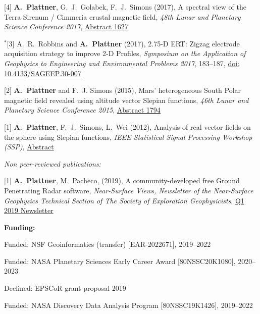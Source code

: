\documentclass[10pt]{article}
\begin{document}
\spcp
\hspace{-0.5cm}[4] \textbf{A.~Plattner}, G.~J.~Golabek, F.~J.~Simons (2017),
A spectral view of the Terra Sirenum / Cimmeria crustal magnetic
field,
\emph{48th Lunar and Planetary Science Conference 2017},
\href{http://www.lpi.usra.edu/meetings/lpsc2017/pdf/1627.pdf}{Abstract 1627}

\spcp
\hspace{-0.67cm}$^*$[3] A.~R.~Robbins and \textbf{A.~Plattner}
(2017),
2.75-D ERT: Zigzag electrode acquisition strategy to improve 2-D
Profiles,
\emph{Symposium on the Application of Geophysics to Engineering and
  Environmental Problems 2017}, 183--187,
\href{http://library.seg.org/doi/pdf/10.4133/SAGEEP.30-007}{doi: 10.4133/SAGEEP.30-007}

\spcp
\hspace{-0.5cm}[2] \textbf{A.~Plattner} and F.~J. Simons (2015),
Mars' heterogeneous South Polar magnetic field revealed using altitude vector Slepian functions,
\emph{46th Lunar and Planetary Science Conference 2015},
\href{http://www.hou.usra.edu/meetings/lpsc2015/pdf/1794.pdf}{Abstract 1794}

\spcp
\hspace{-0.5cm}[1] \textbf{A.~Plattner}, F.~J.~Simons, L.~Wei (2012),
Analysis of real vector fields on the sphere using Slepian functions,
\emph{IEEE Statistical Signal Processing Workshop (SSP)},
\href{http://ieeexplore.ieee.org/stamp/stamp.jsp?tp=&arnumber=6319659}{Abstract}

\spc
\emph{Non peer-reviewed publications:}

\spcp
\hspace{-0.5cm}[1] \textbf{A.~Plattner}, M.~Pacheco, (2019), A
community-developed free Ground Penetrating Radar software,
\emph{Near-Surface Views, Newsletter of the Near-Surface Geophysics
  Technical Section of The Society of Exploration Geophysicists},
\href{https://seg.org/Portals/0/SEG/News%20and%20Resources/Near%20Surface/Near%20Surface%20Newsletter/2011-present/2019_Q1.pdf}{Q1
  2019 Newsletter}


\spc
\textbf{\tsize Funding:}

\spcp
Funded: NSF Geoinformatics (transfer) [EAR-2022671], 2019--2022 

\spcp
Funded: NASA Planetary Sciences Early Career Award [80NSSC20K1080], 2020--2023

\spcp Declined: EPSCoR grant proposal 2019

\spcp
Funded: NASA Discovery Data Analysis Program [80NSSC19K1426], 2019--2022
\end{document}
